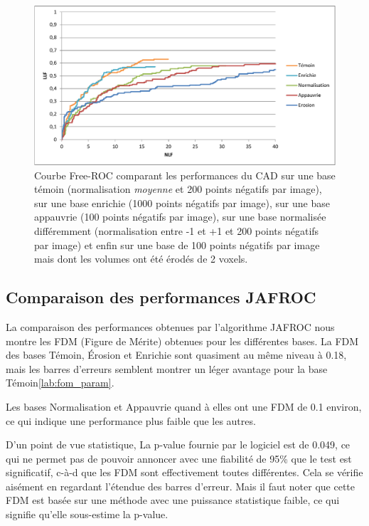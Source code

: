 \begin{figure}[h!]
 
 \begin{center}
   \includegraphics[width=15cm]{images/FROC_param}
 \end{center}
 \label{lab:froc_comp_static}
 \caption{Courbe Free-ROC comparant les performances du CAD sur une base témoin (normalisation \emph{moyenne} et 200 points négatifs par image), sur une base enrichie (1000 points négatifs par image), sur une base appauvrie (100 points négatifs par image), sur une base normalisée différemment (normalisation entre -1 et +1 et 200 points négatifs par image) et enfin sur une base de 100 points négatifs par image mais dont les volumes ont été érodés de 2 voxels.}

\end{figure}


\subsection{Comparaison des performances JAFROC}

La comparaison des performances obtenues par l'algorithme JAFROC\cite{chakraborty1990free} nous montre les FDM (Figure de Mérite) obtenues pour les différentes bases. La FDM des bases Témoin, Érosion et Enrichie sont quasiment au même niveau à 0.18, mais les barres d'erreurs semblent montrer un léger avantage pour la base Témoin\ref{lab:fom_param}.

Les bases Normalisation et Appauvrie quand à elles ont une FDM de 0.1 environ, ce qui indique une performance plus faible que les autres.

D'un point de vue statistique, La p-value fournie par le logiciel est de 0.049, ce qui ne permet pas de pouvoir annoncer avec une fiabilité de 95\% que le test est significatif, c-à-d que les FDM sont effectivement toutes différentes. Cela se vérifie aisément en regardant l'étendue des barres d'erreur. Mais il faut noter que cette FDM est basée sur une méthode avec une puissance statistique faible, ce qui signifie qu'elle sous-estime la p-value.


